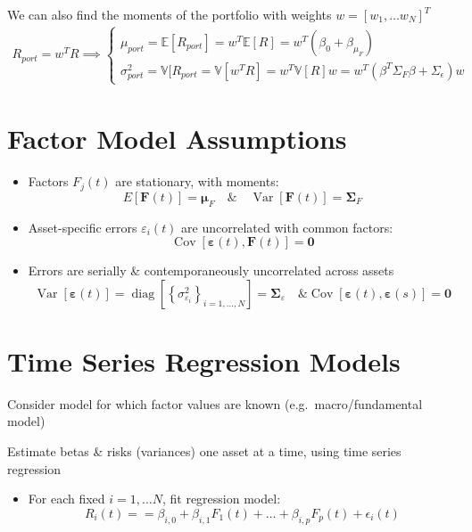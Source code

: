 \documentclass[
  oneside]{book}
\providecommand{\tightlist}{%
  \setlength{\itemsep}{0pt}\setlength{\parskip}{0pt}}
\begin{document}
We can also find the moments of the portfolio with weights \(w = [w_{1}, \dots w_{N}]^{T}\)
\[
\begin{aligned}
R_{port} = w^{T}R \implies \begin{cases}
\mu_{port} = \mathbb{E}[R_{port}] = w^{T}\mathbb{E}[R] = w^{T}(\beta_{0}+\beta_{\mu_{F}}) \\
\sigma^{2}_{port} = \mathbb{V}[R_{port} = \mathbb{V}[w^{T}R] = w^{T}\mathbb{V}[R]w = w^{T}(\beta^{T}\Sigma_{F}\beta+\Sigma_{\epsilon})w
\end{cases}
\end{aligned}
\]

\hypertarget{factor-model-assumptions}{%
\section{Factor Model Assumptions}\label{factor-model-assumptions}}

\begin{itemize}
\tightlist
\item
  Factors \(F_j(t)\) are stationary, with moments:
  \[
  E[\mathbf{F}(t)]=\boldsymbol{\mu}_F \quad \& \quad \operatorname{Var}[\mathbf{F}(t)]=\boldsymbol{\Sigma}_F
  \]
\item
  Asset-specific errors \(\varepsilon_i(t)\) are uncorrelated with common factors:
  \[
  \operatorname{Cov}[\mathbf{\varepsilon}(t), \mathbf{F}(t)]=\mathbf{0}
  \]
\item
  Errors are serially \& contemporaneously uncorrelated across assets
  \[
  \operatorname{Var}[\boldsymbol{\varepsilon}(t)]=\operatorname{diag}\left[\left\{\sigma_{\varepsilon_i}^2\right\}_{i=1, \ldots, N}\right]=\boldsymbol{\Sigma}_{\varepsilon} \quad \& \operatorname{Cov}[\boldsymbol{\varepsilon}(t), \boldsymbol{\varepsilon}(s)]=\mathbf{0}
  \]
\end{itemize}

\hypertarget{time-series-regression-models}{%
\section{Time Series Regression Models}\label{time-series-regression-models}}

Consider model for which factor values are known (e.g.~macro/fundamental model)

Estimate betas \& risks (variances) one asset at a time, using time series regression

\begin{itemize}
\tightlist
\item
  For each fixed \(i=1,\dots N\), fit regression model:
  \[
  R_{i}(t) = = \beta_{i,0} + \beta_{i,1}F_{1}(t)+ \dots + \beta_{i,p}F_{p}(t) + \epsilon_{i}(t)
  \]
\end{itemize}
\end{document}
